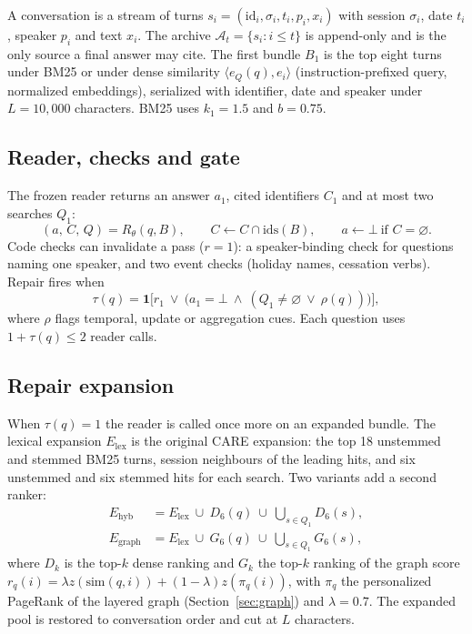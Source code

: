 \documentclass[10pt]{article}
\theoremstyle{plain}
\newcommand{\care}{\textsc{CARE}}
\newcommand{\A}{\mathcal{A}}
\begin{document}
A conversation is a stream of turns $s_i=(\mathrm{id}_i,\sigma_i,t_i,p_i,x_i)$ with session $\sigma_i$, date
$t_i$, speaker $p_i$ and text $x_i$. The archive $\A_t=\{s_i:i\le t\}$ is append-only and is the only source a
final answer may cite. The first bundle $B_1$ is the top eight turns under BM25 or under dense similarity
$\langle e_Q(q),e_i\rangle$ (instruction-prefixed query, normalized embeddings), serialized with identifier,
date and speaker under $L=10{,}000$ characters. BM25 uses $k_1{=}1.5$ and $b{=}0.75$.

\subsection{Reader, checks and gate}

The frozen reader returns an answer $a_1$, cited identifiers $C_1$ and at most two searches $Q_1$:
\begin{equation}
(a,\,C,\,Q)=R_\theta(q,B),\qquad C\leftarrow C\cap\mathrm{ids}(B),\qquad a\leftarrow\bot\ \text{if } C=\varnothing.
\label{eq:reader}
\end{equation}
Code checks can invalidate a pass ($r=1$): a speaker-binding check for questions naming one speaker, and two
event checks (holiday names, cessation verbs). Repair fires when
\begin{equation}
\tau(q)=\mathbf{1}\big[r_1\ \lor\ \big(a_1=\bot\ \land\ (Q_1\neq\varnothing\ \lor\ \rho(q))\big)\big],
\label{eq:gate}
\end{equation}
where $\rho$ flags temporal, update or aggregation cues. Each question uses $1+\tau(q)\le 2$ reader calls.

\subsection{Repair expansion}

When $\tau(q)=1$ the reader is called once more on an expanded bundle. The lexical expansion $E_{\mathrm{lex}}$
is the original \care{} expansion: the top 18 unstemmed and stemmed BM25 turns, session neighbours of the
leading hits, and six unstemmed and six stemmed hits for each search. Two variants add a second ranker:
\begin{align}
E_{\mathrm{hyb}}&=E_{\mathrm{lex}}\ \cup\ D_6(q)\ \cup\ \textstyle\bigcup_{s\in Q_1}D_6(s),\label{eq:hyb}\\
E_{\mathrm{graph}}&=E_{\mathrm{lex}}\ \cup\ G_6(q)\ \cup\ \textstyle\bigcup_{s\in Q_1}G_6(s),\label{eq:graph}
\end{align}
where $D_k$ is the top-$k$ dense ranking and $G_k$ the top-$k$ ranking of the graph score
$r_q(i)=\lambda z(\mathrm{sim}(q,i))+(1-\lambda)z(\pi_q(i))$, with $\pi_q$ the personalized PageRank of the
layered graph (Section~\ref{sec:graph}) and $\lambda=0.7$. The expanded pool is restored to conversation order
and cut at $L$ characters.
\end{document}
